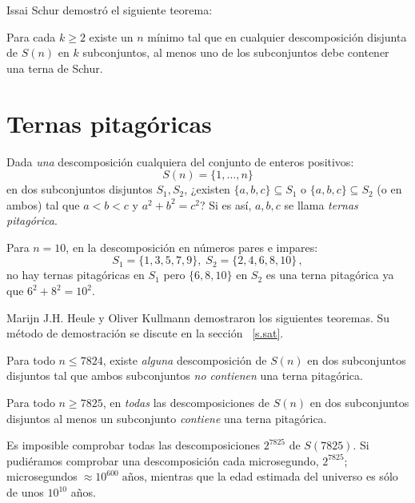 Issai Schur demostró el siguiente teorema:
\begin{theorem}[Schur]
Para cada $k\geq 2$ existe un $n$ mínimo tal que en cualquier descomposición disjunta de $S(n)$ en $k$ subconjuntos, al menos uno de los subconjuntos debe contener una terna de Schur.
\end{theorem}


\section{Ternas pitagóricas}\label{s.pyth}

\begin{definition}
Dada \emph{una} descomposición cualquiera del conjunto de enteros positivos:
\[
S(n)=\{1,\ldots,n\}
\]
en dos subconjuntos disjuntos $S_1,S_2$, ¿existen $\{a,b,c\}\subseteq S_1$ o $\{a,b,c\}\subseteq S_2$ (o en ambos) tal que $a\!<\!b\!<\!c$ y $a^2+b^2=c^2$? Si es así, $ {a,b,c}$ se llama \emph{ternas pitagórica}.
\end{definition}

\begin{example}
Para $n=10$, en la descomposición en números pares e impares:
\[
S_1 = \{1,3,5,7,9\},\; S_2=\{2,4,6,8,10\}\,,
\]
no hay ternas pitagóricas en $S_1$ pero $\{6,8,10\}$ en $S_2$ es una terna pitagórica ya que $6^2+8^2=10^2$.
\end{example}

Marijn J.H. Heule y Oliver Kullmann demostraron los siguientes teoremas. Su método de demostración se discute en la sección ~\ref{s.sat}.

\begin{theorem}
Para todo $n\leq 7824$, existe \emph{alguna} descomposición de $S(n)$ en dos subconjuntos disjuntos tal que ambos subconjuntos \emph{no contienen} una terna pitagórica.
\end{theorem}

\begin{theorem}
Para todo $n\geq 7825$, en \emph{todas} las descomposiciones de $S(n)$ en dos subconjuntos disjuntos al menos un subconjunto \emph{contiene} una terna pitagórica.
\end{theorem}
Es imposible comprobar todas las descomposiciones $2^{7825}$ de $S(7825)$. Si pudiéramos comprobar una descomposición cada microsegundo, $2^{7825}$; \textrm{microsegundos}$\;\approx 10^{600}\; \textrm{años}$, mientras que la edad estimada del universo es sólo de unos $10^{10}$ años.

